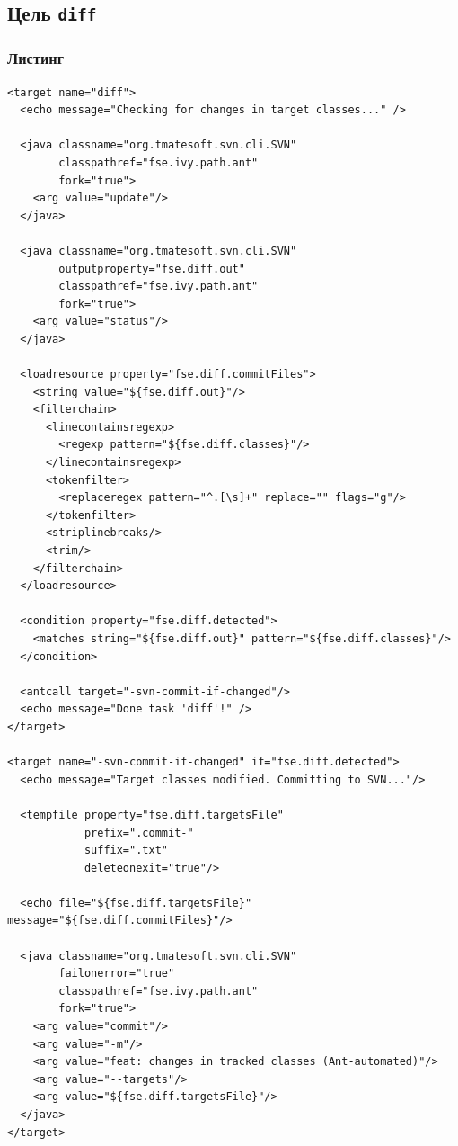 \subsection{Цель \texttt{diff}}

\subsubsection{Листинг}

\begin{lstlisting}[caption={Часть содержимого файла \texttt{build.xml}},captionpos=b]
<target name="diff">
  <echo message="Checking for changes in target classes..." />

  <java classname="org.tmatesoft.svn.cli.SVN"
        classpathref="fse.ivy.path.ant"
        fork="true">
    <arg value="update"/>
  </java>

  <java classname="org.tmatesoft.svn.cli.SVN"
        outputproperty="fse.diff.out"
        classpathref="fse.ivy.path.ant"
        fork="true">
    <arg value="status"/>
  </java>

  <loadresource property="fse.diff.commitFiles">
    <string value="${fse.diff.out}"/>
    <filterchain>
      <linecontainsregexp>
        <regexp pattern="${fse.diff.classes}"/>
      </linecontainsregexp>
      <tokenfilter>
        <replaceregex pattern="^.[\s]+" replace="" flags="g"/>
      </tokenfilter>
      <striplinebreaks/>
      <trim/>
    </filterchain>
  </loadresource>

  <condition property="fse.diff.detected">
    <matches string="${fse.diff.out}" pattern="${fse.diff.classes}"/>
  </condition>

  <antcall target="-svn-commit-if-changed"/>
  <echo message="Done task 'diff'!" />
</target>

<target name="-svn-commit-if-changed" if="fse.diff.detected">
  <echo message="Target classes modified. Committing to SVN..."/>

  <tempfile property="fse.diff.targetsFile" 
            prefix=".commit-" 
            suffix=".txt"
            deleteonexit="true"/>
  
  <echo file="${fse.diff.targetsFile}" message="${fse.diff.commitFiles}"/>

  <java classname="org.tmatesoft.svn.cli.SVN"
        failonerror="true"
        classpathref="fse.ivy.path.ant"
        fork="true">
    <arg value="commit"/>
    <arg value="-m"/>
    <arg value="feat: changes in tracked classes (Ant-automated)"/>
    <arg value="--targets"/>
    <arg value="${fse.diff.targetsFile}"/>
  </java>
</target>
\end{lstlisting}

